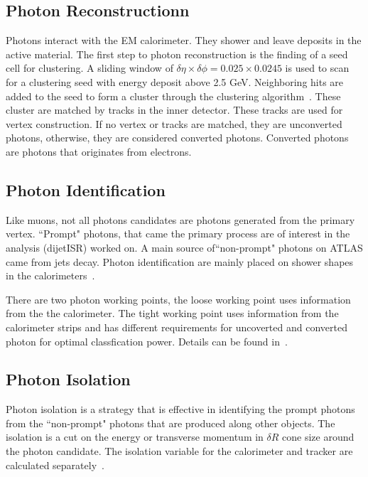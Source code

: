 \subsection{Photon Reconstructionn}
Photons interact with the EM calorimeter. They shower and leave deposits in the active material. The first step to photon reconstruction is the finding of a seed cell for clustering. A sliding window of $\delta \eta \times \delta \phi = 0.025 \times 0.0245$ is used to scan for a clustering seed with energy deposit above 2.5 GeV. Neighboring hits are added to the seed to form a cluster through the clustering algorithm~\cite{Lampl:1099735}. 
These cluster are matched by tracks in the inner detector. These tracks are used for vertex construction. If no vertex or tracks are matched, they are unconverted photons, otherwise, they are considered converted photons. Converted photons are photons that originates from electrons. 


\subsection{Photon Identification}
Like muons, not all photons candidates are photons generated from the primary vertex. ``Prompt" photons, that came the primary process are of interest in the analysis (dijetISR) worked on. A main source of``non-prompt" photons on ATLAS came from jets decay. Photon identification are mainly placed on shower shapes in the calorimeters~\cite{gammaCalibration2019}.

There are two photon working points, the loose working point uses information from the the calorimeter. The tight working point uses information from the calorimeter strips and has different requirements for uncoverted and converted photon for optimal classfication power. Details can be found in~\cite{gammaCalibration2019}. 

\subsection{Photon Isolation}
Photon isolation is a strategy that is effective in identifying the prompt photons from the ``non-prompt" photons that are produced along other objects. The isolation is a cut on the energy or transverse momentum in $\delta R $ cone size around the photon candidate. The isolation variable for the calorimeter and tracker are calculated separately~\cite{gammaCalibration2019}.

